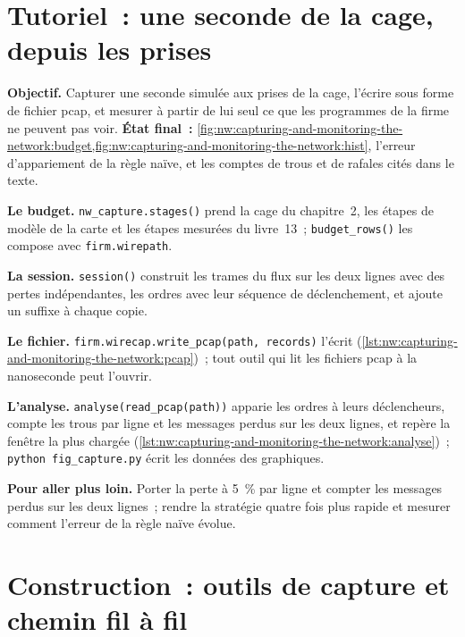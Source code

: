 \section{Tutoriel~: une seconde de la cage, depuis les prises}\label{tut:nw:capturing-and-monitoring-the-network:tut}

\begin{tutorial}
\textbf{Objectif.} Capturer une seconde simulée aux prises de la cage, l'écrire sous forme de fichier pcap, et mesurer à partir de lui seul ce que
les programmes de la firme ne peuvent pas voir. \textbf{État final~:} \cref{fig:nw:capturing-and-monitoring-the-network:budget,fig:nw:capturing-and-monitoring-the-network:hist},
l'erreur d'appariement de la règle naïve, et les comptes de trous et de rafales cités dans le texte.
\begin{tutsteps}
\item \textbf{Le budget.} \texttt{nw\_capture.stages()} prend la cage du chapitre~2, les étapes de modèle de la carte et les étapes mesurées du livre~13~;
  \texttt{budget\_rows()} les compose avec \texttt{firm.wirepath}.
\item \textbf{La session.} \texttt{session()} construit les trames du flux sur les deux lignes avec des pertes indépendantes, les ordres avec leur
  séquence de déclenchement, et ajoute un suffixe à chaque copie.
\item \textbf{Le fichier.} \texttt{firm.wirecap.write\_pcap(path, records)} l'écrit (\cref{lst:nw:capturing-and-monitoring-the-network:pcap})~;
  tout outil qui lit les fichiers pcap à la nanoseconde peut l'ouvrir.
\item \textbf{L'analyse.} \texttt{analyse(read\_pcap(path))} apparie les ordres à leurs déclencheurs, compte les trous par ligne et les messages perdus sur
  les deux lignes, et repère la fenêtre la plus chargée (\cref{lst:nw:capturing-and-monitoring-the-network:analyse})~; \texttt{python fig\_capture.py} écrit les
  données des graphiques.
\end{tutsteps}
\textbf{Pour aller plus loin.} Porter la perte à 5~\% par ligne et compter les messages perdus sur les deux lignes~; rendre la stratégie quatre fois plus rapide et
mesurer comment l'erreur de la règle naïve évolue.
\end{tutorial}

\section{Construction~: outils de capture et chemin fil à fil}\label{bld:nw:capturing-and-monitoring-the-network:wirecap}

